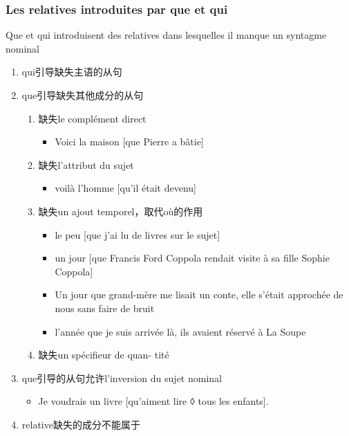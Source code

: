 \documentclass[UTF8]{report}
\begin{document}
\subsubsection{Les relatives introduites par que et qui}
Que et qui introduisent des relatives dans lesquelles il manque un syntagme nominal
\begin{enumerate}
    \item qui引导缺失主语的从句
    \item que引导缺失其他成分的从句
    \begin{enumerate}
        \item 缺失le complément direct
        \begin{itemize}
            \item Voici la maison [que Pierre a bâtie]
        \end{itemize}
        \item 缺失l’attribut du sujet
        \begin{itemize}
            \item voilà l’homme [qu’il était devenu] 
        \end{itemize}
        \item 缺失un ajout temporel，取代où的作用
        \begin{itemize}
            \item le peu [que j’ai lu de livres sur le sujet]
        \end{itemize}
        \begin{itemize}
            \item un jour [que Francis Ford Coppola rendait visite à sa fille Sophie Coppola] 
            \item Un jour que grand-mère me lisait un conte, elle s’était approchée de nous sans faire de bruit
            \item l’année que je suis arrivée là, ils avaient réservé à La Soupe 
        \end{itemize}
        \item 缺失un spécifieur de quan- tité
    \end{enumerate}
    \item que引导的从句允许l’inversion du sujet nominal
    \begin{itemize}
        \item Je voudrais un livre [qu’aiment lire ◊ tous les enfants].
    \end{itemize}
    \item relative缺失的成分不能属于
    \begin{enumerate}

\end{enumerate}
\end{enumerate}
\end{document}

